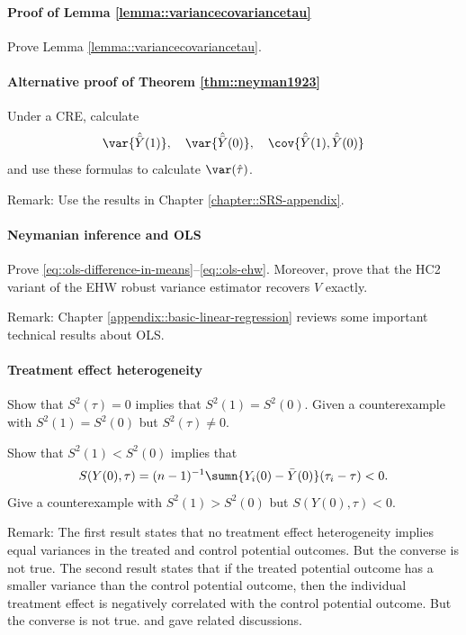 \paragraph{Proof of Lemma \ref{lemma::variancecovariancetau}}\label{hw::proof-covariance-basic}


Prove Lemma \ref{lemma::variancecovariancetau}. 


\paragraph{Alternative proof of Theorem \ref{thm::neyman1923}}\label{hw::neyman-alternative-proof}

Under a CRE, calculate 
$$
\var\{  \hat{\bar{Y}}(1)  \} ,\quad
\var\{  \hat{\bar{Y}}(0)  \} ,\quad
\cov\{  \hat{\bar{Y}}(1) ,  \hat{\bar{Y}}(0)  \} 
$$
and use these formulas to calculate $\var(\hat{\tau} )$. 

Remark: Use the results in Chapter \ref{chapter::SRS-appendix}. 





\paragraph{Neymanian inference and OLS}
\label{hw::neyman-ols-nox}


Prove \eqref{eq::ols-difference-in-means}--\eqref{eq::ols-ehw}. Moreover, prove that the HC2 variant of the EHW robust variance estimator recovers $\hat{V}$ exactly. 

Remark: Chapter \ref{appendix::basic-linear-regression} reviews some important technical results about OLS.
 
 



\paragraph{Treatment effect heterogeneity}\label{hw::treatment-effect-heterogeneity-neyman}


Show that $S^2(\tau) = 0$ implies that $S^2(1) = S^2(0)$. Given a counterexample with $S^2(1) = S^2(0)$ but $S^2(\tau) \neq  0$. 


Show that $S^2(1) < S^2(0)$ implies that 
$$
S(Y(0),\tau)  = (n-1)^{-1} \sumn \{ Y_i(0)  - \bar{Y}(0) \} (\tau_i - \tau) <0.
$$
Give a counterexample with $S^2(1) > S^2(0)$ but $S(Y(0),\tau)  < 0 .$



Remark: The first result states that no treatment effect heterogeneity implies equal variances in the treated and control potential outcomes. But the converse is not true. The second result states that if the treated potential outcome has a smaller variance than the control potential outcome, then the individual treatment effect is negatively correlated with the control potential outcome. But the converse is not true. \citet[][page 293]{gerber2012field} and \citet[][Appendix B.3]{ding2019decomposing} gave related discussions. 



